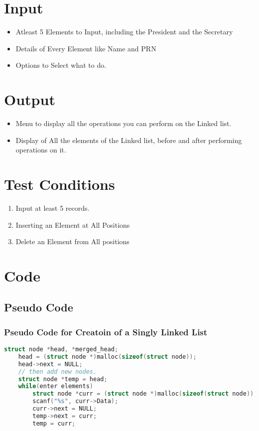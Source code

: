 \documentclass[11pt]{article}
\begin{document}
\section{Input}

\begin{itemize}
	\item Atleast 5 Elements to Input, including the President and the Secretary
	\item Details of Every Element like Name and PRN
	\item Options to Select what to do.
\end{itemize}

\section{Output}
\begin{itemize}
	\item Menu to display all the operations you can perform on the Linked list.
	\item Display of All the elements of the Linked list, before and after performing operations on it.
\end{itemize}

\section{Test Conditions}
\begin{enumerate}
	\item Input at least 5 records.
	\item Inserting an Element at All Positions
	\item Delete an Element from All positions
\end{enumerate}

\section{Code}
\subsection{Pseudo Code}
\subsubsection{Pseudo Code for Creatoin of a Singly Linked List}
\begin{lstlisting}[language=C]
	struct node *head, *merged_head;
	head = (struct node *)malloc(sizeof(struct node));
	head->next = NULL;
	// then add new nodes. 
	struct node *temp = head;
	while(enter elements)
		struct node *curr = (struct node *)malloc(sizeof(struct node));
		scanf("%s", curr->Data);
		curr->next = NULL;
		temp->next = curr;
		temp = curr;
\end{lstlisting}
\end{document}

